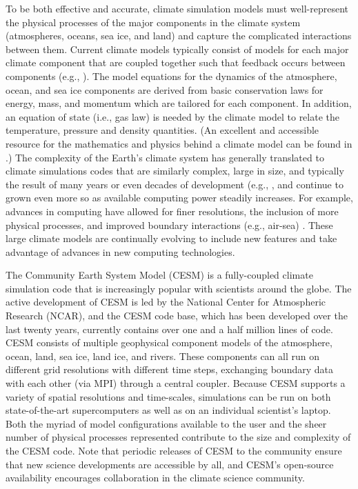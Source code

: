 To be both effective and accurate, climate simulation models must well-represent the physical processes of the major components in the climate system (atmospheres, oceans, sea ice, and land) and capture the complicated interactions between them.  Current climate models typically consist of models for each major climate component that are coupled together such that feedback occurs between components (e.g., \cite{washington2005}).  The model equations for the dynamics of the atmosphere, ocean, and sea ice components are derived from basic conservation laws for energy, mass, and momentum which are tailored for each component.  In addition, an equation of state (i.e., gas law) is needed by the climate model to relate the temperature, pressure and density quantities. (An excellent and accessible resource for the mathematics and physics behind a climate model can be found in \cite{washington2005}.)  The complexity of the Earth's climate system has generally translated to climate simulations codes that are similarly complex, large in size, and typically the result of many years or even decades of development (e.g., \cite{easterbrook2011},\cite{pipitone2012} and continue to grown even more so as available computing power steadily increases.  For example, advances in computing have allowed for finer resolutions, the inclusion of more physical processes, and improved boundary interactions (e.g., air-sea) \cite{washington2009}.  These large climate models are continually evolving to include new features and take advantage of advances in new computing technologies.


The Community Earth System Model (CESM) is a fully-coupled climate simulation code \cite{cesm2013} that is increasingly popular with scientists around the globe.  The active development of CESM is led by the National Center for Atmospheric Research (NCAR), and the CESM code base, %
which has been developed over the last twenty years, currently contains over one and a half million lines of code.  CESM consists of multiple geophysical component models of the atmosphere, ocean, land, sea ice, land ice, and rivers.  These components can all run on different grid resolutions with different time steps, exchanging boundary data with each other (via MPI) through a central coupler.  Because CESM supports a variety of spatial resolutions and time-scales, simulations can be run on both state-of-the-art supercomputers as well as on an individual scientist's laptop.  Both the myriad of model configurations available to the user and the sheer number of physical processes represented contribute to the size and complexity of the CESM code.  Note that periodic releases of CESM to the community ensure that new science developments are accessible by all, and CESM's open-source availability encourages collaboration in the climate science community.

